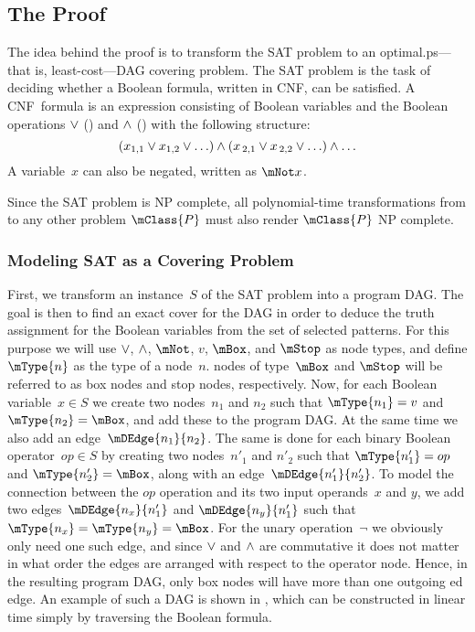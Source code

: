 \subsection{The Proof}

The idea behind the proof is to transform the \gls{SAT problem} to an
\gls{optimal.ps}---that is, least-cost---\gls{DAG covering} problem.
%
The
\gls{SAT problem} is the task of deciding whether a Boolean formula, written in
\gls{CNF}, can be satisfied.
%
A \gls{CNF}~formula is an expression consisting of
Boolean variables and the Boolean operations $\vee$ (\tOr) and $\wedge$ (\tAnd)
with the following structure:
\begin{displaymath}
  (x_{1,1} \vee x_{1,2} \vee \ldots) \wedge (x_{\,2,1} \vee x_{\,2,2} \vee \ldots) \wedge
  \ldots
\end{displaymath}
A variable~$x$ can also be negated, written as \mbox{$\mNot x$}.

Since the \gls{SAT problem} is \gls{NP complete}, all polynomial-time
transformations from  to any other problem $\mClass{P}$
must also render $\mClass{P}$ \gls{NP complete}.


\subsubsection{Modeling SAT as a Covering Problem}

First, we transform an instance~$S$ of the \gls{SAT problem} into a \gls{program
  DAG}.
%
The goal is then to find an exact cover for the \gls{DAG} in order to
deduce the truth assignment for the Boolean variables from the set of selected
\glspl{pattern}.
%
For this purpose we will use $\vee$, $\wedge$, $\mNot$, $v$,
$\mBox$, and $\mStop$ as \gls{node} types, and define $\mType{n}$ as the type of
a \gls{node}~$n$.
%
\Glspl{node} of type~$\mBox$ and $\mStop$ will be referred to
as \glspl{box node} and \glspl{stop node}, respectively.
%
Now, for each Boolean
variable~\mbox{$x \in S$} we create two \glspl{node}~$n_1$ and $n_2$ such that
\mbox{$\mType{n_1} = v$} and \mbox{$\mType{n_2} = \mBox$}, and add these to the
\gls{program DAG}.
%
At the same time we also add an
\gls{edge}~$\mDEdge{n_1}{n_2}$.
%
The same is done for each binary Boolean
operator~\mbox{$\mathit{op} \in S$} by creating two \glspl{node}~$n'_1$ and
$n'_2$ such that \mbox{$\mType{n'_1} = op$} and \mbox{$\mType{n'_2} = \mBox$},
along with an \gls{edge}~$\mDEdge{n'_1}{n'_2}$.
%
To model the connection between
the $\mathit{op}$ operation and its two input operands~$x$ and $y$, we add two
\glspl{edge}~$\mDEdge{n_x}{n'_1}$ and $\mDEdge{n_y}{n'_1}$ such that
\mbox{$\mType{n_x} = \mType{n_y} = \mBox$}.
%
For the unary operation~$\neg$ we
obviously only need one such \gls{edge}, and since $\vee$ and $\wedge$ are
commutative it does not matter in what order the \glspl{edge} are arranged with
respect to the operator \gls{node}.
%
Hence, in the resulting \gls{program DAG},
only \glspl{box node} will have more than one \gls{outgoing ed} \gls{edge}.
%
An
example of such a \gls{DAG} is shown in , which can
be constructed in linear time simply by traversing the Boolean formula.



